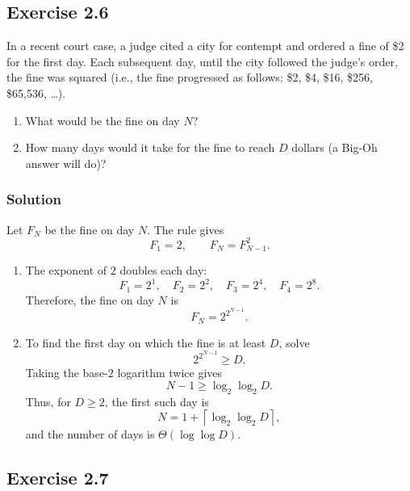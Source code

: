 \documentclass[12pt,a4paper]{article}
\begin{document}
\subsection*{\color{sectionnavy}Exercise 2.6}

\noindent
In a recent court case, a judge cited a city for contempt and ordered a
fine of \$2 for the first day. Each subsequent day, until the city
followed the judge's order, the fine was squared (i.e., the fine
progressed as follows: \$2, \$4, \$16, \$256, \$65{,}536, \ldots).

\begin{enumerate}
  \renewcommand{\labelenumi}{\alph{enumi}.}
  \item What would be the fine on day $N$?
  \item How many days would it take for the fine to reach $D$ dollars
  (a Big-Oh answer will do)?
\end{enumerate}

\subsubsection*{\color{sectionnavy}Solution}

Let $F_N$ be the fine on day $N$. The rule gives
\[
F_1=2,
\qquad
F_N=F_{N-1}^2.
\]

\begin{enumerate}
  \renewcommand{\labelenumi}{\alph{enumi}.}

  \item The exponent of $2$ doubles each day:
  \[
  F_1=2^1,\quad F_2=2^2,\quad F_3=2^4,\quad F_4=2^8.
  \]
  Therefore, the fine on day $N$ is
  \[
  \boxed{F_N=2^{2^{N-1}}}.
  \]

  \item To find the first day on which the fine is at least $D$, solve
  \[
  2^{2^{N-1}}\geq D.
  \]
  Taking the base-$2$ logarithm twice gives
  \[
  N-1\geq \log_2\log_2 D.
  \]
  Thus, for $D\geq2$, the first such day is
  \[
  \boxed{N=1+\left\lceil\log_2\log_2 D\right\rceil},
  \]
  and the number of days is $\Theta(\log\log D)$.
\end{enumerate}

\clearpage
\subsection*{\color{sectionnavy}Exercise 2.7}
\end{document}
